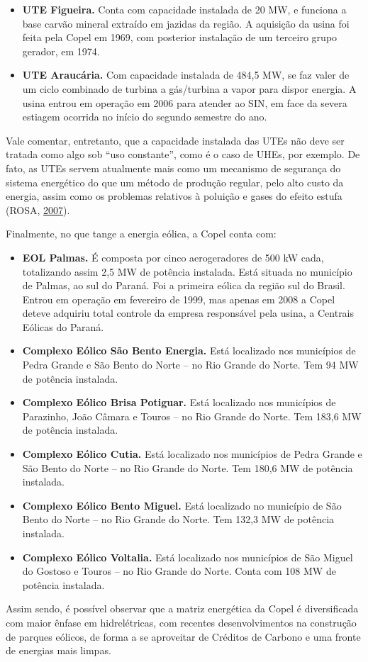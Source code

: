 \documentclass[grad,numbers]{coppe}
\providecommand{\tightlist}{%
  \setlength{\itemsep}{0pt}\setlength{\parskip}{0pt}}
\begin{document}
  \begin{itemize}
  \tightlist
  \item
    \textbf{UTE Figueira.} Conta com capacidade instalada de 20 MW, e funciona a base carvão mineral extraído em jazidas da região. A aquisição da usina foi feita pela Copel em 1969, com posterior instalação de um terceiro grupo gerador, em 1974.
  \item
    \textbf{UTE Araucária.} Com capacidade instalada de 484,5 MW, se faz valer de um ciclo combinado de turbina a gás/turbina a vapor para dispor energia. A usina entrou em operação em 2006 para atender ao SIN, em face da severa estiagem ocorrida no início do segundo semestre do ano.
  \end{itemize}
  Vale comentar, entretanto, que a capacidade instalada das UTEs não deve ser tratada como algo sob ``uso constante'', como é o caso de UHEs, por exemplo. De fato, as UTEs servem atualmente mais como um mecanismo de segurança do sistema energético do que um método de produção regular, pelo alto custo da energia, assim como os problemas relativos à poluição e gases do efeito estufa (ROSA, \protect\hyperlink{ref-rosa2007}{2007}).

  Finalmente, no que tange a energia eólica, a Copel conta com:
  \begin{itemize}
  \tightlist
  \item
    \textbf{EOL Palmas.} É composta por cinco aerogeradores de 500 kW cada, totalizando assim 2,5 MW de potência instalada. Está situada no município de Palmas, ao sul do Paraná. Foi a primeira eólica da região sul do Brasil. Entrou em operação em fevereiro de 1999, mas apenas em 2008 a Copel deteve adquiriu total controle da empresa responsável pela usina, a Centrais Eólicas do Paraná.
  \item
    \textbf{Complexo Eólico São Bento Energia.} Está localizado nos municípios de Pedra Grande e São Bento do Norte -- no Rio Grande do Norte. Tem 94 MW de potência instalada.
  \item
    \textbf{Complexo Eólico Brisa Potiguar.} Está localizado nos municípios de Parazinho, João Câmara e Touros -- no Rio Grande do Norte. Tem 183,6 MW de potência instalada.
  \item
    \textbf{Complexo Eólico Cutia.} Está localizado nos municípios de Pedra Grande e São Bento do Norte -- no Rio Grande do Norte. Tem 180,6 MW de potência instalada.
  \item
    \textbf{Complexo Eólico Bento Miguel.} Está localizado no município de São Bento do Norte -- no Rio Grande do Norte. Tem 132,3 MW de potência instalada.
  \item
    \textbf{Complexo Eólico Voltalia.} Está localizado nos municípios de São Miguel do Gostoso e Touros -- no Rio Grande do Norte. Conta com 108 MW de potência instalada.
  \end{itemize}
  Assim sendo, é possível observar que a matriz energética da Copel é diversificada com maior ênfase em hidrelétricas, com recentes desenvolvimentos na construção de parques eólicos, de forma a se aproveitar de Créditos de Carbono e uma fronte de energias mais limpas.
\end{document}
